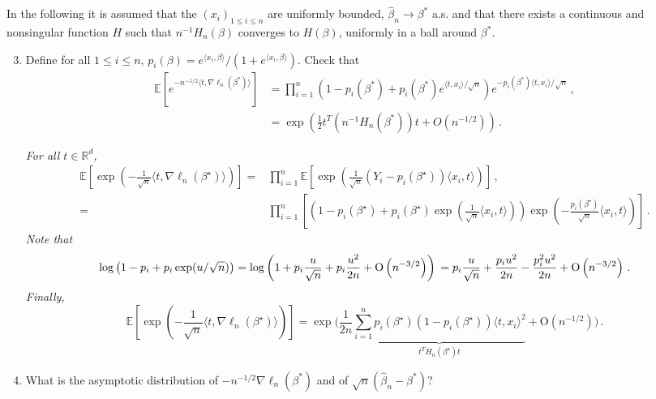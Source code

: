 \documentclass[a4paper,10pt,fleqn]{article}
\newcommand{\eqsp}{\,}
\newcommand{\rset}{\ensuremath{\mathbb{R}}}
\newcommand{\1}{\ensuremath{\mathbbm{1}}}
\newcommand{\bE}{\mathbb{E}}
\begin{document}
In the following it is assumed that the $(x_{i})_{1\leqslant i\leqslant n}$ are uniformly bounded, $\widehat \beta_n\to \beta^*$ a.s. and that there exists a continuous and nonsingular function $H$ such that $n^{-1}H_{n}(\beta)$ converges to $H(\beta)$, uniformly in a ball around $\beta^*$.
\begin{enumerate}  \setcounter{enumi}{2}
\item Define for all $1\leqslant i \leqslant n$, $p_{i}(\beta)=e^{\langle x_{i},\beta\rangle}/ \left(1+e^{\langle x_{i},\beta\rangle}\right)$. Check that
\begin{align*}
\bE \left[e^{-n^{-1/2}\langle t,\nabla\ell_{n}(\beta^*)\rangle}\right]& =\prod_{i=1}^n \left({1-p_{i}(\beta^*)+p_{i}(\beta^*)e^{\langle t,x_{i}\rangle/\sqrt{n}}}\right) e^{-p_{i}(\beta^*)\langle t,x_{i}\rangle/\sqrt{n}}\eqsp, \\
&=\exp\left(\frac{1}{2}t^T\left(n^{-1}H_{n}(\beta^*)\right)t+O(n^{-1/2})\right)\eqsp.
\end{align*}

\vspace{.2cm}

{\em For all $t\in\rset^d$,
\begin{align*}
 \bE \left[ \exp\left( - \frac{1}{\sqrt{n}} \langle t, \nabla \ell_n(\beta^{\star}) \rangle \right) \right] = & \prod_{i=1}^n \bE \left[ \exp\left( \frac{1}{\sqrt{n}} (Y_i - p_i(\beta^{\star}) )\langle x_i, t \rangle \right) \right]\eqsp,\\
= & \prod_{i=1}^n \left[ \left( 1 - p_i(\beta^{\star}) +  p_i(\beta^{\star}) \exp\left( \frac{1}{\sqrt{n}} \langle x_i, t \rangle \right) \right) \exp \left( - \frac{ p_i(\beta^{\star})}{\sqrt{n}} \langle x_i, t \rangle \right) \right]\eqsp.
\end{align*}
Note that 
$$
\log \left( 1 - p_i + p_i \exp(u/\sqrt{n}) \right) =  \log\left( 1 + p_i \frac{u}{\sqrt{n}} + p_i \frac{u^2}{2n} + \textrm{O} \left( n^{-3/2} \right)\right)\\
 = p_i \frac{u}{\sqrt{n}} + \frac{p_i u^2}{2n} - \frac{p_i^2 u^2}{2n} + \textrm{O} \left( n^{-3/2} \right)\eqsp.
$$
Finally, 
$$
\bE \left[ \exp\left( - \frac{1}{\sqrt{n}} \langle t, \nabla \ell_n(\beta^{\star}) \rangle \right) \right] = 
\exp\Bigg( \frac{1}{2n} \underbrace{\sum_{i=1}^n p_i(\beta^{\star}) (1 - p_i(\beta^{\star})) \langle t, x_i \rangle^2}_{t^T H_n(\beta^{\star}) t} + \textrm{O}(n^{-1/2})\Bigg)\eqsp.
$$
}
\item What is the asymptotic distribution of $-n^{-1/2}\nabla\ell_{n}(\beta^*)$ and of $\sqrt{n}(\widehat \beta_n-\beta^*)$?


\end{enumerate}
\end{document}
